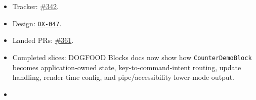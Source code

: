 \begin{itemize}
\tightlist
\item
  Tracker: \href{https://github.com/flyingrobots/bijou/issues/342}{\#342}.
\item
  Design: \href{https://github.com/flyingrobots/bijou/blob/cbd70612140e7a450d764b3c7be1c6af878b99bc/docs/design/DX-047-blocks-app-binding-snippets.md}{\texttt{D\allowbreak{}X\allowbreak{}-\allowbreak{}0\allowbreak{}4\allowbreak{}7}}.
\item
  Landed PRs: \href{https://github.com/flyingrobots/bijou/pull/361}{\#361}.
\item
  Completed slices: DOGFOOD Blocks docs now show how \texttt{C\allowbreak{}o\allowbreak{}u\allowbreak{}n\allowbreak{}t\allowbreak{}e\allowbreak{}r\allowbreak{}D\allowbreak{}e\allowbreak{}m\allowbreak{}o\allowbreak{}B\allowbreak{}l\allowbreak{}o\allowbreak{}c\allowbreak{}k} becomes application-owned state, key-to-command-intent routing, update handling, render-time config, and pipe/accessibility lower-mode output.
\item

\end{itemize}
